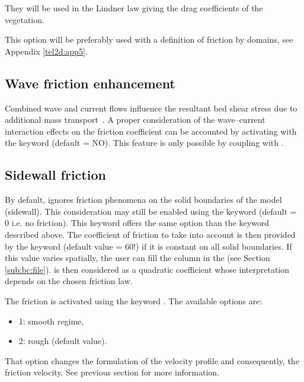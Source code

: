 They will be used in the Lindner law giving the drag coefficients of the
vegetation.

This option will be preferably used with a definition of friction by domains,
see Appendix \ref{tel2d:app5}.


\subsection{Wave friction enhancement}

Combined wave and current flows influence the resultant bed shear stress due to
additional mass transport~\cite{OConnorYoo1988}.
A proper consideration of the wave--current interaction effects on the friction
coefficient can be accounted by activating with the keyword
 (default = NO).
This feature is only possible by coupling  with \tomawac.


\subsection{Sidewall friction}

By default,  ignores friction phenomena on the solid boundaries
of the model (sidewall).
This consideration may still be enabled using the keyword
 (default = 0 i.e. no friction).
This keyword offers the same option than the keyword
 described above.
The coefficient of friction to take into account is then provided
by the keyword 
(default value = 60!) if it is constant on all solid boundaries.
If this value varies spatially, the user can fill the column 
in the  (see Section \ref{sub:bc:file}).
 is then considered as a quadratic coefficient whose
interpretation depends on the chosen friction law.

The friction is activated using the keyword
.
The available options are:

\begin{itemize}
\item 1: smooth regime,

\item 2: rough (default value).
\end{itemize}

That option changes the formulation of the velocity profile and consequently,
the friction velocity. See previous section for more information.


